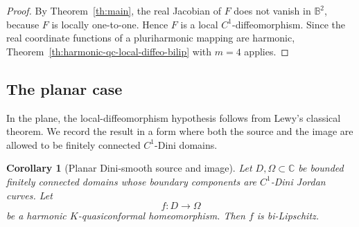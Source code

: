 \documentclass[11pt]{amsart}
\newtheorem{corollary}[theorem]{Corollary}
\theoremstyle{definition}
\theoremstyle{remark}
\newcommand{\C}{\mathbb C}
\begin{document}
\begin{proof}
By Theorem~\ref{th:main}, the real Jacobian of \(F\) does not vanish in
\(\mathbb B^2\), because \(F\) is locally one-to-one.  Hence \(F\) is a
local \(C^1\)-diffeomorphism.  Since the real coordinate functions of a
pluriharmonic mapping are harmonic, Theorem~\ref{th:harmonic-qc-local-diffeo-bilip}
with \(m=4\) applies.
\end{proof}

\subsection{The planar case}

In the plane, the local-diffeomorphism hypothesis follows from Lewy's
classical theorem.  We record the result in a form where both the source and
the image are allowed to be finitely connected \(C^1\)-Dini domains.

\begin{corollary}[Planar Dini-smooth source and image]
\label{cor:planar-dini-bilip}
Let \(D,\Omega\subset\C\) be bounded finitely connected domains whose
boundary components are \(C^1\)-Dini Jordan curves. Let
\[
        f:D\to\Omega
\]
be a harmonic \(K\)-quasiconformal homeomorphism. Then \(f\) is
bi-Lipschitz.
\end{corollary}
\end{document}
